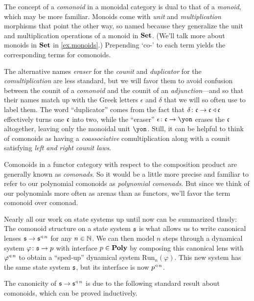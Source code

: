 \documentclass[Book-Poly]{subfiles}
\begin{document}
\begin{remark}
The concept of a \emph{comonoid} in a monoidal category is dual to that of a \emph{monoid}, which may be more familiar.
Monoids come with \emph{unit} and \emph{multiplication} morphisms that point the other way, so named because they generalize the unit and multiplication operations of a monoid in $\mathbf{Set}$.
(We'll talk more about monoids in $\mathbf{Set}$ in \cref{ex.monoids}.)
Prepending `co-' to each term yields the corresponding terms for comonoids.

The alternative names \emph{eraser} for the \emph{counit} and \emph{duplicator} for the \emph{comultiplication} are less standard, but we will favor them to avoid confusion between the counit of a \emph{comonoid} and the counit of an \emph{adjunction}---and so that their names match up with the Greek letters $\epsilon$ and $\delta$ that we will so often use to label them.
The word ``duplicator'' comes from the fact that $\delta\colon\mathfrak{c}\to\mathfrak{c}\mathbin{\triangleleft}\mathfrak{c}$ effectively turns one $\mathfrak{c}$ into two, while the ``eraser'' $\epsilon\colon\car{c}\to\yon$ erases the $\mathfrak{c}$ altogether, leaving only the monoidal unit $\yon$.
Still, it can be helpful to think of comonoids as having a \emph{coassociative} comultiplication along with a counit satisfying \emph{left and right counit laws}.
\end{remark}

\begin{remark}
Comonoids in a functor category with respect to the composition product are generally known as \emph{comonads}.
So it would be a little more precise and familiar to refer to our polynomial comonoids as \emph{polynomial comonads}.
But since we think of our polynomials more often as arenas than as functors, we’ll favor the term comonoid over comonad.
\end{remark}

\begin{example}
Nearly all our work on state systems up until now can be summarized thusly:
The comonoid structure on a state system $\mathfrak{s}$ is what allows us to write canonical lenses $\mathfrak{s}\to\mathfrak{s}^{\mathbin{\triangleleft}\,n}$ for any $n\in\mathbb{N}$.
We can then model $n$ steps through a dynamical system $\varphi\colon\mathfrak{s}\to p$ with interface $p\in\mathbf{Poly}$ by composing this canonical lens with $\varphi^{\mathbin{\triangleleft}\,n}$ to obtain a ``sped-up'' dynamical system $\text{Run}_n(\varphi)$.
This new system has the same state system $\mathfrak{s}$, but its interface is now $p^{\mathbin{\triangleleft}\,n}$.

The canonicity of $\mathfrak{s}\to\mathfrak{s}^{\mathbin{\triangleleft}\,n}$ is due to the following standard result about comonoids, which can be proved inductively. 
\end{example}
\end{document}

